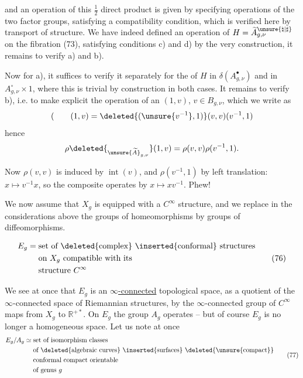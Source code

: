 
and an operation of this \(\frac12\) direct product is given  by  specifying operations of the two factor groups, satisfying a compatibility condition, which is verified here by transport of structure. We have indeed defined an operation of \(H=\widetilde A_{g,\nu}^{\unsure{\natural|\sharp}}\) on the fibration (73),  satisfying conditions c) and d) by the very construction, it remains to verify a) and b).

Now for a), it suffices to verify it separately for the  of \(H\) in \(\delta(A_{g,\nu}^{\bullet})\) and in \(A_{g,\nu}^{\circ}\times 1\), where this is trivial by construction in both cases. It remains to verify b), i.e. to make explicit the operation of an  \((1,v)\), \(v\in B_{g,\nu}\), which we write as
\[
 (\qquad (1,v)=\deleted{(\unsure{v^{-1}},1)}(v,v)(v^{-1},1)
\]
hence
\[
 \rho\deleted{_{\unsure{\widetilde A}_{g,\nu}}}(1,v)=\rho(v,v)\rho(v^{-1},1).
\]

Now \(\rho(v,v)\) is induced by \(\operatorname{int}(v)\),  and \(\rho(v^{-1},1)\) by left translation: \(x\mapsto v^{-1}x\), so the composite operates by \(x\mapsto xv^{-1}\). Phew!


We now assume that \(X_g\) is equipped with a \(C^\infty\) structure, and we replace in the considerations  above the groups of homeomorphisms by groups of diffeomorphisms.

\[
 \begin{aligned}
 E_g={}&\text{set of \deleted{complex} \inserted{conformal} structures}\\
 &\text{on }X_g\text{ compatible with its}\\
 &\text{structure }C^\infty
 \end{aligned}
 \tag{76}
\]

 We see at once that \(E_g\) is an \uline{\(\infty\)-connected} topological space, as a quotient of the \(\infty\)-connected space  of Riemannian structures, by the  \(\infty\)-connected group of \(C^\infty\) maps from \(X_g\) to \(\mathbb R^{+*}\). On \(E_g\) the group \(A_g\) operates -- but of course \(E_g\) is no longer a homogeneous space. Let us note at once
\[
 \begin{aligned}
 E_g/A_g\simeq{}&\text{set of isomorphism classes}\\
 &\text{of \deleted{algebraic curves} \inserted{surfaces} \deleted{\unsure{compact}}}\\
 &\text{conformal compact orientable}\\
 &\text{of genus }g
 \end{aligned}
 \tag{77}
\]

